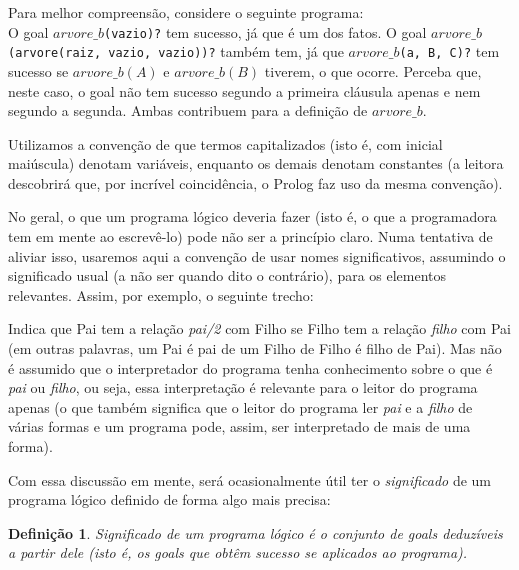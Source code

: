 \documentclass{article}
\newtheorem{definition}{Definição}[section]
\theoremstyle{remark}
\begin{document}
Para melhor compreensão, considere o seguinte programa:\\



O goal {\tt $arvore\_b$(vazio)?} tem sucesso, já que é um dos fatos. O goal {\tt $arvore\_b$(arvore(raiz, vazio, vazio))?} também tem, já que {\tt $arvore\_b$(a, B, C)?} tem sucesso se $arvore\_b(A)$ e $arvore\_b(B)$ tiverem, o que ocorre. Perceba que, neste caso, o goal não tem sucesso segundo a primeira cláusula apenas e nem segundo a segunda. Ambas contribuem para a definição de $arvore\_b$.

Utilizamos a convenção de que termos capitalizados (isto é, com inicial maiúscula) denotam variáveis, enquanto os demais denotam constantes (a leitora descobrirá que, por incrível coincidência, o Prolog faz uso da mesma convenção).

No geral, o que um programa lógico deveria fazer (isto é, o que a programadora tem em mente ao escrevê-lo) pode não ser a princípio claro. Numa tentativa de aliviar isso, usaremos aqui a convenção de usar nomes significativos, assumindo o significado usual (a não ser quando dito o contrário), para os elementos relevantes. Assim, por exemplo, o seguinte trecho:




Indica que Pai tem a relação \textit{pai/2} com Filho se Filho tem a relação \textit{filho} com Pai (em outras palavras, um Pai é pai de um Filho de Filho é filho de Pai). Mas não é assumido que o interpretador do programa tenha conhecimento sobre o que é \textit{pai} ou \textit{filho}, ou seja, essa interpretação é relevante para o leitor do programa apenas (o que também significa que o leitor do programa ler \textit{pai} e a \textit{filho} de várias formas e um programa pode, assim,
ser interpretado de mais de uma forma).

Com essa discussão em mente, será ocasionalmente útil ter o \textit{significado} de um programa lógico definido de forma algo mais precisa:

  \theoremstyle{definition}
  \begin{definition}{Significado}
    de um programa lógico é o conjunto de goals deduzíveis a partir dele (isto é, os goals que obtêm sucesso se aplicados ao programa).
  \end{definition}
\end{document}
